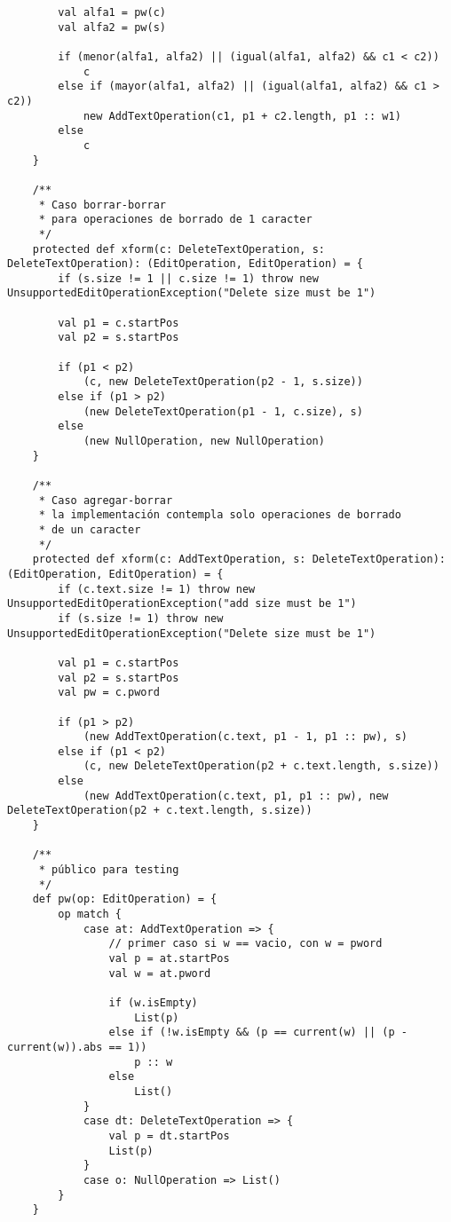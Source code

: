{\begin{verbatim}
        val alfa1 = pw(c)
        val alfa2 = pw(s)

        if (menor(alfa1, alfa2) || (igual(alfa1, alfa2) && c1 < c2))
            c
        else if (mayor(alfa1, alfa2) || (igual(alfa1, alfa2) && c1 > c2))
            new AddTextOperation(c1, p1 + c2.length, p1 :: w1)
        else
            c
    }

    /**
     * Caso borrar-borrar
     * para operaciones de borrado de 1 caracter
     */
    protected def xform(c: DeleteTextOperation, s: DeleteTextOperation): (EditOperation, EditOperation) = {
        if (s.size != 1 || c.size != 1) throw new UnsupportedEditOperationException("Delete size must be 1")

        val p1 = c.startPos
        val p2 = s.startPos

        if (p1 < p2)
            (c, new DeleteTextOperation(p2 - 1, s.size))
        else if (p1 > p2)
            (new DeleteTextOperation(p1 - 1, c.size), s)
        else
            (new NullOperation, new NullOperation)
    }

    /**
     * Caso agregar-borrar
     * la implementación contempla solo operaciones de borrado
     * de un caracter
     */
    protected def xform(c: AddTextOperation, s: DeleteTextOperation): (EditOperation, EditOperation) = {
        if (c.text.size != 1) throw new UnsupportedEditOperationException("add size must be 1")
        if (s.size != 1) throw new UnsupportedEditOperationException("Delete size must be 1")

        val p1 = c.startPos
        val p2 = s.startPos
        val pw = c.pword

        if (p1 > p2)
            (new AddTextOperation(c.text, p1 - 1, p1 :: pw), s)
        else if (p1 < p2)
            (c, new DeleteTextOperation(p2 + c.text.length, s.size))
        else
            (new AddTextOperation(c.text, p1, p1 :: pw), new DeleteTextOperation(p2 + c.text.length, s.size))
    }

    /**
     * público para testing
     */
    def pw(op: EditOperation) = {
        op match {
            case at: AddTextOperation => {
                // primer caso si w == vacio, con w = pword
                val p = at.startPos
                val w = at.pword

                if (w.isEmpty)
                    List(p)
                else if (!w.isEmpty && (p == current(w) || (p - current(w)).abs == 1))
                    p :: w
                else
                    List()
            }
            case dt: DeleteTextOperation => {
                val p = dt.startPos
                List(p)
            }
            case o: NullOperation => List()
        }
    }


\end{verbatim}}
